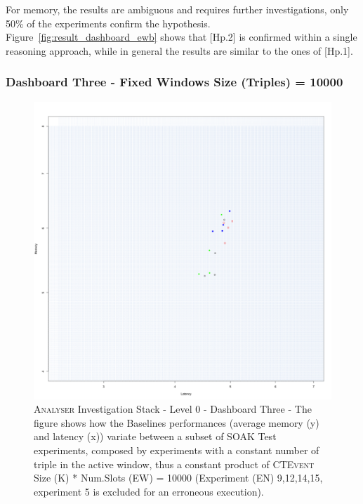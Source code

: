 For memory, the results are ambiguous and requires further investigations, only 50\% of the experiments confirm the hypothesis. Figure~\ref{fig:result_dashboard_ewb} shows that [Hp.2] is confirmed within a single reasoning approach, while in general the results are similar to the ones of [Hp.1].

\subsubsection{Dashboard Three - Fixed Windows Size (Triples) = 10000 } 

\begin{figure}[h!tbp]
	\centering
	\includegraphics[width=0.85\linewidth]{images/dashboard-3}	
	\caption[\textsc{Analyser} Investigation Stack - Level 0 - Dashboard Three - Multiplot Version]	{\textsc{Analyser} Investigation Stack - Level 0 - Dashboard Three - The figure shows how the Baselines performances (average memory (y) and latency (x))  variate between a subset of SOAK Test experiments, composed by experiments with a constant number of triple in the active window, thus a constant product of \textsc{CTEvent} Size (K) * Num.Slots (EW) = 10000 (Experiment (EN) 9,12,14,15, experiment 5 is excluded for an erroneous execution).}
	\label{fig:result_dashboard_probb}
\end{figure}

